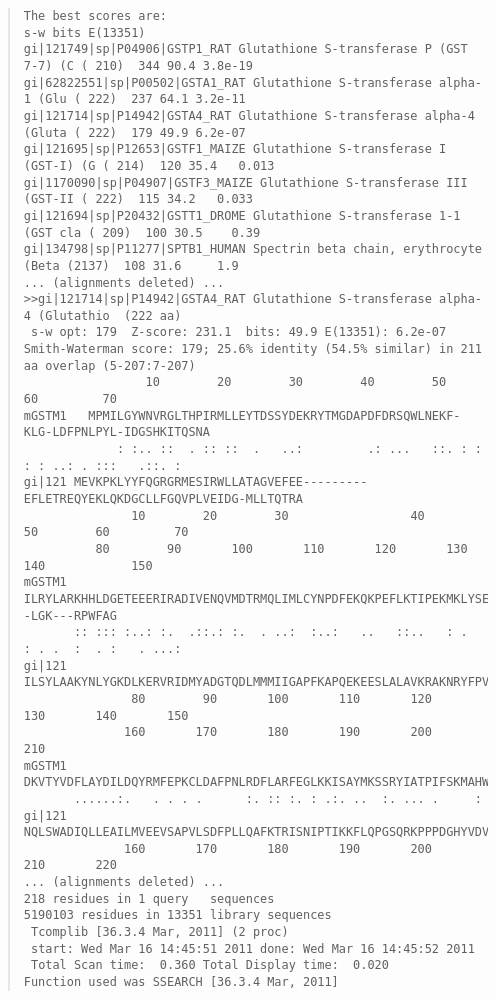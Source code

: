 \begin{footnotesize}
\begin{quote}
\begin{verbatim}
The best scores are:                                                          s-w bits E(13351)
gi|121749|sp|P04906|GSTP1_RAT Glutathione S-transferase P (GST 7-7) (C ( 210)  344 90.4 3.8e-19
gi|62822551|sp|P00502|GSTA1_RAT Glutathione S-transferase alpha-1 (Glu ( 222)  237 64.1 3.2e-11
gi|121714|sp|P14942|GSTA4_RAT Glutathione S-transferase alpha-4 (Gluta ( 222)  179 49.9 6.2e-07
gi|121695|sp|P12653|GSTF1_MAIZE Glutathione S-transferase I (GST-I) (G ( 214)  120 35.4   0.013
gi|1170090|sp|P04907|GSTF3_MAIZE Glutathione S-transferase III (GST-II ( 222)  115 34.2   0.033
gi|121694|sp|P20432|GSTT1_DROME Glutathione S-transferase 1-1 (GST cla ( 209)  100 30.5    0.39
gi|134798|sp|P11277|SPTB1_HUMAN Spectrin beta chain, erythrocyte (Beta (2137)  108 31.6     1.9
... (alignments deleted) ...
>>gi|121714|sp|P14942|GSTA4_RAT Glutathione S-transferase alpha-4 (Glutathio  (222 aa)
 s-w opt: 179  Z-score: 231.1  bits: 49.9 E(13351): 6.2e-07
Smith-Waterman score: 179; 25.6% identity (54.5% similar) in 211 aa overlap (5-207:7-207)
                 10        20        30        40        50          60         70     
mGSTM1   MPMILGYWNVRGLTHPIRMLLEYTDSSYDEKRYTMGDAPDFDRSQWLNEKF-KLG-LDFPNLPYL-IDGSHKITQSNA
             : :.. ::  . :: ::  .   ..:         .: ...   ::. : : : : ..: . :::   .::. :
gi|121 MEVKPKLYYFQGRGRMESIRWLLATAGVEFEE---------EFLETREQYEKLQKDGCLLFGQVPLVEIDG-MLLTQTRA
               10        20        30                 40        50        60         70
          80        90       100       110       120       130       140            150
mGSTM1 ILRYLARKHHLDGETEEERIRADIVENQVMDTRMQLIMLCYNPDFEKQKPEFLKTIPEKMKLYSEF--LGK---RPWFAG
       :: ::: :..: :.  .::.: :.  . ..:  :..:   ..   ::..   : .   : . .  :  . :   . ...:
gi|121 ILSYLAAKYNLYGKDLKERVRIDMYADGTQDLMMMIIGAPFKAPQEKEESLALAVKRAKNRYFPVFEKILKDHGEAFLVG
               80        90       100       110       120       130       140       150
              160       170       180       190       200       210            
mGSTM1 DKVTYVDFLAYDILDQYRMFEPKCLDAFPNLRDFLARFEGLKKISAYMKSSRYIATPIFSKMAHWSNK    
       ......:.   . . . .      :. :: :. : .:. ..  :. ... .     :               
gi|121 NQLSWADIQLLEAILMVEEVSAPVLSDFPLLQAFKTRISNIPTIKKFLQPGSQRKPPPDGHYVDVVRTVLKF
              160       170       180       190       200       210       220  
... (alignments deleted) ...
218 residues in 1 query   sequences
5190103 residues in 13351 library sequences
 Tcomplib [36.3.4 Mar, 2011] (2 proc)
 start: Wed Mar 16 14:45:51 2011 done: Wed Mar 16 14:45:52 2011
 Total Scan time:  0.360 Total Display time:  0.020
Function used was SSEARCH [36.3.4 Mar, 2011]
\end{verbatim}
\end{quote}
\end{footnotesize}
\vspace{-4.0ex}
